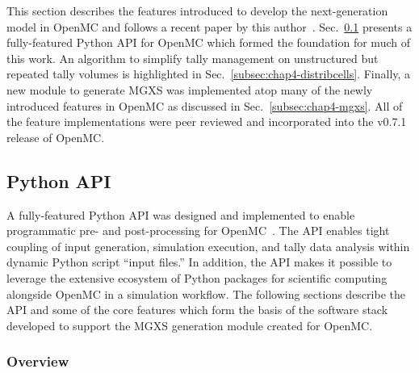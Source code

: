

This section describes the features introduced to develop the next-generation model in OpenMC and follows a recent paper by this author~\cite{boyd2016bigdata}. Sec.~\ref{subsec:chap4-py-api} presents a fully-featured Python \ac{API} for OpenMC which formed the foundation for much of this work. An algorithm to simplify tally management on unstructured but repeated tally volumes is highlighted in Sec.~\ref{subsec:chap4-distribcells}. Finally, a new module to generate \ac{MGXS} was implemented atop many of the newly introduced features in OpenMC as discussed in Sec.~\ref{subsec:chap4-mgxs}. All of the feature implementations were peer reviewed and incorporated into the v0.7.1 release of OpenMC.

\subsection{Python API}
\label{subsec:chap4-py-api}

A fully-featured Python \ac{API} was designed and implemented to enable programmatic pre- and post-processing for OpenMC~\cite{boyd2016bigdata}. The \ac{API} enables tight coupling of input generation, simulation execution, and tally data analysis within dynamic Python script ``input files.'' In addition, the \ac{API} makes it possible to leverage the extensive ecosystem of Python packages for scientific computing alongside OpenMC in a simulation workflow. The following sections describe the \ac{API} and some of the core features which form the basis of the software stack developed to support the \ac{MGXS} generation module created for OpenMC.

\subsubsection{Overview}
\label{subsubsec:chap4-py-api-overview}

